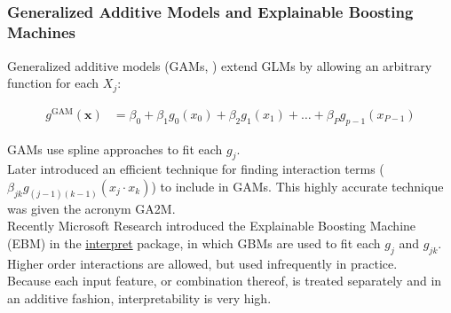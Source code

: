 \documentclass[11pt,aspectratio=169,hyperref={colorlinks}]{beamer}
\begin{document}
	\subsection*{}

	\begin{frame}
		
		\frametitle{Generalized Additive Models and Explainable Boosting Machines}
		
		\small
		
		Generalized additive models (GAMs, \cite{esl}) extend GLMs by allowing an arbitrary function for each $X_j$: 	
		
		\begin{equation}
			\begin{aligned}\label{eq:gam}
			g^{\text{GAM}}(\mathbf{x}) &= \beta_0 + \beta_1 g_0(x_0) + \beta_2 g_1(x_1) + \dots + \beta_P g_{p-1}(x_{P-1})
			\end{aligned}
		\end{equation}	
		
		GAMs use spline approaches to fit each $g_j$.\\
		\vspace{10pt}
		Later \cite{ga2m} introduced an efficient technique for finding interaction terms ($\beta_{jk} g_{(j-1)(k-1)}(x_j \cdot x_k)$) to include in GAMs. This highly accurate technique was given the acronym GA2M.\\
		\vspace{10pt}
		Recently Microsoft Research introduced the Explainable Boosting Machine (EBM) in the \href{https://github.com/interpretml/interpret/}{interpret} package, in which GBMs are used to fit each $g_j$ and $g_{jk}$. Higher order interactions are allowed, but used infrequently in practice. \\
		\vspace{10pt}
		Because each input feature, or combination thereof, is treated separately and in an additive fashion, interpretability is very high. 
		
	\end{frame}
\end{document}
